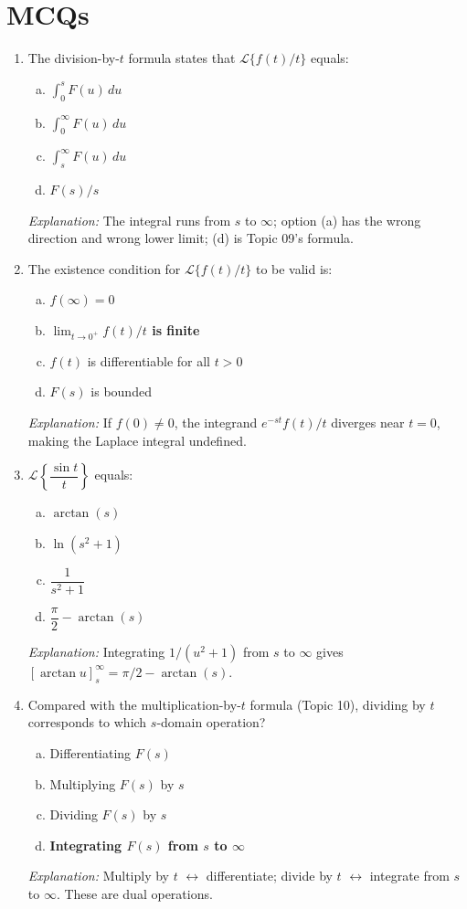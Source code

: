 \documentclass[12pt,a4paper]{article}
\begin{document}
\section{MCQs}

\begin{enumerate}[leftmargin=2em, label=\textbf{MCQ\arabic*.}]

\item The division-by-$t$ formula states that $\mathcal{L}\{f(t)/t\}$ equals:
\begin{enumerate}[(a)]
  \item $\displaystyle\int_0^s F(u)\,du$
  \item $\displaystyle\int_0^\infty F(u)\,du$
  \item \textbf{$\displaystyle\int_s^\infty F(u)\,du$}
  \item $F(s)/s$
\end{enumerate}
\textit{Explanation:} The integral runs from $s$ to $\infty$; option (a) has
the wrong direction and wrong lower limit; (d) is Topic 09's formula.

\medskip
\item The existence condition for $\mathcal{L}\{f(t)/t\}$ to be valid is:
\begin{enumerate}[(a)]
  \item $f(\infty)=0$
  \item \textbf{$\lim_{t\to 0^+}f(t)/t$ is finite}
  \item $f(t)$ is differentiable for all $t>0$
  \item $F(s)$ is bounded
\end{enumerate}
\textit{Explanation:} If $f(0)\neq 0$, the integrand $e^{-st}f(t)/t$ diverges
near $t=0$, making the Laplace integral undefined.

\medskip
\item $\mathcal{L}\!\left\{\dfrac{\sin t}{t}\right\}$ equals:
\begin{enumerate}[(a)]
  \item $\arctan(s)$
  \item $\ln(s^2+1)$
  \item $\dfrac{1}{s^2+1}$
  \item \textbf{$\dfrac{\pi}{2} - \arctan(s)$}
\end{enumerate}
\textit{Explanation:} Integrating $1/(u^2+1)$ from $s$ to $\infty$ gives
$[\arctan u]_s^\infty = \pi/2 - \arctan(s)$.

\medskip
\item Compared with the multiplication-by-$t$ formula (Topic 10), dividing
by $t$ corresponds to which $s$-domain operation?
\begin{enumerate}[(a)]
  \item Differentiating $F(s)$
  \item Multiplying $F(s)$ by $s$
  \item Dividing $F(s)$ by $s$
  \item \textbf{Integrating $F(s)$ from $s$ to $\infty$}
\end{enumerate}
\textit{Explanation:} Multiply by $t$ $\leftrightarrow$ differentiate; divide by $t$ $\leftrightarrow$ integrate
from $s$ to $\infty$. These are dual operations.


\end{enumerate}
\end{document}
